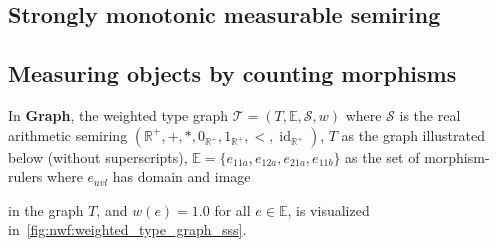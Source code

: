 
\subsection{Strongly monotonic measurable semiring}
\label{sec:strongly_monotonic_measurable_semiring}

\subsection{Measuring objects by counting morphisms}
\begin{example}
    \label{nwf:example:weighted_type_graph}
     In \textbf{Graph}, the weighted type graph $\mathcal{T} = (T, \mathbb{E}, \mathcal{S}, w)$ where $\mathcal{S}$ is the real arithmetic semiring $(\mathbb{R}^+, +, *, 0_{\mathbb{R}^+}, 1_{\mathbb{R}^+}, <, \operatorname{id}_{\mathbb{R}^+})$,
     $T$ as the graph illustrated below (without superscripts), $\mathbb{E}=\{e_{11a},e_{12a},e_{21a},e_{11b}\}$ as the set of morphism-rulers where 
     $e_{uvl}$ has domain 
      and image 
     in the graph $T$,
    and $w(e) = 1.0$ for all $e \in \mathbb{E}$, is visualized in~\autoref{fig:nwf:weighted_type_graph_sss}.
    \begin{figure}[!htbp] 
        \centering
        \caption{}
        \label{fig:nwf:weighted_type_graph_sss}
    \end{figure}
\end{example}

